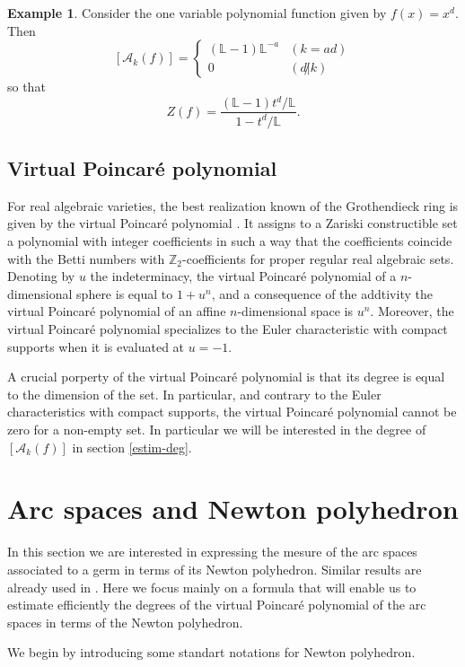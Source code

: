 \documentclass[12pt,a4paper,leqno]{amsart}
\theoremstyle{definition}
\newtheorem{exam}[thm]{Example}
\begin{document}
\begin{exam} Consider the one variable polynomial function given by
  $f(x)=x^d$. Then
$$
[\mathcal A_k(f)]=
\begin{cases}
({\mathbb{L}}-1){\mathbb{L}}^{-a}&(k=ad)\\
0& (d\not| k)
\end{cases}$$
so that 
$$Z(f)=\frac{({\mathbb{L}}-1)t^d/{\mathbb{L}}}{1-t^d/{\mathbb{L}}}.$$
\end{exam}

\subsection{Virtual Poincar\'e polynomial}\label{virt}

For real algebraic varieties, the best realization known of the
Grothendieck ring is given by the virtual Poincar\'e polynomial
\cite{MCP}. It assigns to a Zariski constructible set a polynomial
with integer coefficients in such a way that the coefficients coincide
with the Betti numbers with ${\mathbb{Z}}_2$-coefficients for proper regular
real algebraic sets. Denoting by $u$ the indeterminacy, the virtual
Poincar\'e polynomial of a $n$-dimensional sphere is equal to $1+u^n$,
and a consequence of the addtivity the virtual Poincar\'e polynomial
of an affine $n$-dimensional space is $u^n$.
Moreover, the virtual Poincar\'e polynomial
specializes to the Euler characteristic with compact supports when it
is evaluated at $u=-1$.

A crucial porperty of the virtual Poincar\'e polynomial is that its
degree is equal to the dimension of the set. In particular, and
contrary to the Euler characteristics with compact supports, the
virtual Poincar\'e polynomial cannot be zero for a non-empty set. In particular
we will be interested in the degree of $[\mathcal A_k(f)]$ in section \ref{estim-deg}.

\section{Arc spaces and Newton polyhedron}
In this section we are interested in expressing the mesure of the arc
spaces associated to a germ in terms of its Newton polyhedron. Similar
results are already used in \cite{DK,DL-modif,Guibert}. Here we focus mainly on a
formula that will enable us to estimate efficiently the degrees of the
virtual Poincar\'e polynomial of the arc spaces in terms of the Newton polyhedron.

We begin by introducing some standart notations for Newton polyhedron.
\end{document}
